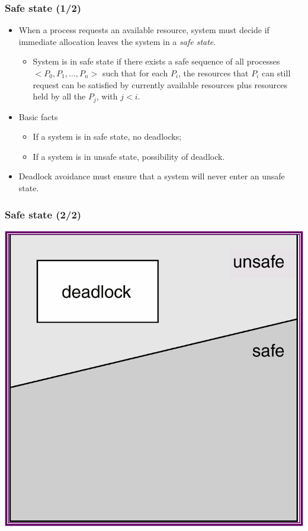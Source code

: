 \documentclass[CJKutf8,xcolor=pdftex,dvipsnames,table]{beamer}
\begin{document}
\begin{CJK*}{UTF8}{song}
  \begin{frame}
  \frametitle{Safe state (1/2)} \pause
  \begin{itemize}
  \item{When a process requests an available resource, system must decide if immediate allocation leaves the system in a \emph{safe state}.} \pause
    \begin{itemize}
    \item{System is in safe state if there exists a safe sequence of all processes $<P_0, P_1, ..., P_n>$ such that for each $P_i$, the resources that $P_i$ can still request can be satisfied by currently available resources plus resources held by all the $P_j$, with $j<i$.} \pause
    \end{itemize}
  \item{Basic facts} \pause
    \begin{itemize}
    \item{If a system is in safe state, no deadlocks;} \pause
    \item{If a system is in unsafe state,  possibility of deadlock.} \pause
    \end{itemize}
  \item{Deadlock avoidance must ensure that a system will never enter an unsafe state.}
  \end{itemize}
  \end{frame}
  
  \begin{frame}
  \frametitle{Safe state (2/2)} \pause
  \begin{center}
    \includegraphics[scale=1]{v6f8-4}
  \end{center}
  \end{frame}
  

\end{CJK*}
\end{document}
